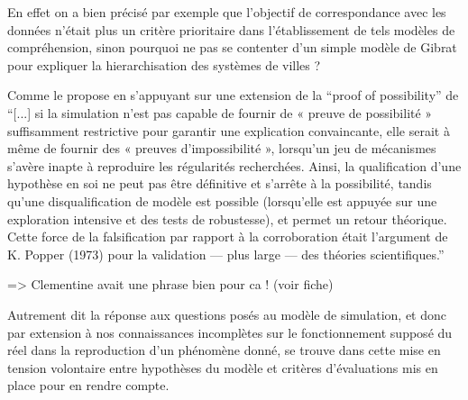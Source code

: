 En effet on a bien précisé par exemple que l'objectif de correspondance avec les données n'était plus un critère prioritaire dans l'établissement de tels modèles de compréhension, sinon pourquoi ne pas se contenter d'un simple modèle de Gibrat pour expliquer la hierarchisation des systèmes de villes ? 

Comme le propose \textcite[300]{Cottineau2014b} en s'appuyant sur une extension de la \foreignquote{english}{proof of possibility} de \textcite{Marchionni2013} \enquote{[...] si la simulation n’est pas capable de fournir de « preuve de possibilité » suffisamment restrictive pour garantir une explication convaincante, elle serait à même de fournir des « preuves d’impossibilité », lorsqu’un jeu de mécanismes s’avère inapte à reproduire les régularités recherchées. Ainsi, la qualification d’une hypothèse en soi ne peut pas être définitive et s’arrête à la possibilité, tandis qu’une disqualification de modèle est possible (lorsqu’elle est appuyée sur une exploration intensive et des tests de robustesse), et permet un retour théorique. Cette force de la falsification par rapport à la corroboration était l’argument de K. Popper (1973) pour la validation — plus large — des théories scientifiques.}




=> Clementine avait une phrase bien pour ca ! (voir fiche)


Autrement dit la réponse aux questions posés au modèle de simulation, et donc par extension à nos connaissances incomplètes sur le fonctionnement supposé du réel dans la reproduction d'un phénomène donné, se trouve dans cette mise en tension volontaire entre hypothèses du modèle et critères d'évaluations mis en place pour en rendre compte.

